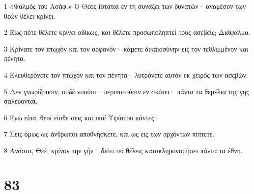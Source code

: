 \par 1 «Ψαλμός του Ασάφ.» Ο Θεός ίσταται εν τη συνάξει των δυνατών· αναμέσον των θεών θέλει κρίνει.
\par 2 Έως πότε θέλετε κρίνει αδίκως, και θέλετε προσωποληπτεί τους ασεβείς; Διάψαλμα.
\par 3 Κρίνατε τον πτωχόν και τον ορφανόν· κάμετε δικαιοσύνην εις τον τεθλιμμένον και πένητα.
\par 4 Ελευθερόνετε τον πτωχόν και τον πένητα· λυτρόνετε αυτόν εκ χειρός των ασεβών.
\par 5 Δεν γνωρίζουσιν, ουδέ νοούσι· περιπατούσιν εν σκότει· πάντα τα θεμέλια της γης σαλεύονται.
\par 6 Εγώ είπα, θεοί είσθε σεις και υιοί Υψίστου πάντες·
\par 7 Σεις όμως ως άνθρωποι αποθνήσκετε, και ως εις των αρχόντων πίπτετε.
\par 8 Ανάστα, Θεέ, κρίνον την γήν· διότι συ θέλεις κατακληρονομήσει πάντα τα έθνη.

\chapter{83}

